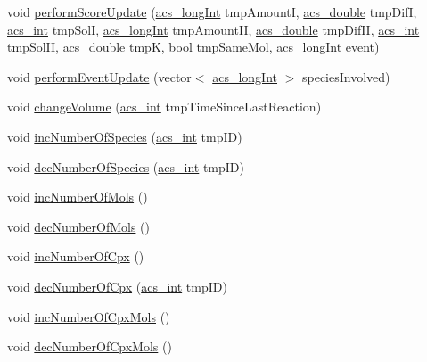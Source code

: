 \begin{DoxyCompactItemize}
\item 
void \hyperlink{a00014_ad25f6aa3ab2ac6097f57828bcf78e5c9}{perform\-Score\-Update} (\hyperlink{a00050_a19319d75f02db4308bc5c0026d98cd85}{acs\-\_\-long\-Int} tmp\-Amount\-I, \hyperlink{a00050_ab776853a005fcbf56af0424a2a4dd607}{acs\-\_\-double} tmp\-Dif\-I, \hyperlink{a00050_a8d277355641a098190360234e2ebde35}{acs\-\_\-int} tmp\-Sol\-I, \hyperlink{a00050_a19319d75f02db4308bc5c0026d98cd85}{acs\-\_\-long\-Int} tmp\-Amount\-I\-I, \hyperlink{a00050_ab776853a005fcbf56af0424a2a4dd607}{acs\-\_\-double} tmp\-Dif\-I\-I, \hyperlink{a00050_a8d277355641a098190360234e2ebde35}{acs\-\_\-int} tmp\-Sol\-I\-I, \hyperlink{a00050_ab776853a005fcbf56af0424a2a4dd607}{acs\-\_\-double} tmp\-K, bool tmp\-Same\-Mol, \hyperlink{a00050_a19319d75f02db4308bc5c0026d98cd85}{acs\-\_\-long\-Int} event)
\item 
void \hyperlink{a00014_ae7ef2ef3277e15e1644496e118ebb9bc}{perform\-Event\-Update} (vector$<$ \hyperlink{a00050_a19319d75f02db4308bc5c0026d98cd85}{acs\-\_\-long\-Int} $>$ species\-Involved)
\item 
void \hyperlink{a00014_a0156a2d7219396e58a930731966b0c66}{change\-Volume} (\hyperlink{a00050_a8d277355641a098190360234e2ebde35}{acs\-\_\-int} tmp\-Time\-Since\-Last\-Reaction)
\item 
void \hyperlink{a00014_a9fdf3a3b16809edd87c1b1963ef0a67f}{inc\-Number\-Of\-Species} (\hyperlink{a00050_a8d277355641a098190360234e2ebde35}{acs\-\_\-int} tmp\-I\-D)
\item 
void \hyperlink{a00014_a69a926e0b9bb4f4b29876d0e45b54d84}{dec\-Number\-Of\-Species} (\hyperlink{a00050_a8d277355641a098190360234e2ebde35}{acs\-\_\-int} tmp\-I\-D)
\item 
void \hyperlink{a00014_ae356db3b6ee374b998e9f041216b4b75}{inc\-Number\-Of\-Mols} ()
\item 
void \hyperlink{a00014_af042f7904c92fdd239995bebbab2cf60}{dec\-Number\-Of\-Mols} ()
\item 
void \hyperlink{a00014_a69ae530ef6f9298e3ab8304157709404}{inc\-Number\-Of\-Cpx} ()
\item 
void \hyperlink{a00014_aadd057e7038269e6fac314a12a3bf334}{dec\-Number\-Of\-Cpx} (\hyperlink{a00050_a8d277355641a098190360234e2ebde35}{acs\-\_\-int} tmp\-I\-D)
\item 
void \hyperlink{a00014_ab101d2158575829ddfe846087040f2fa}{inc\-Number\-Of\-Cpx\-Mols} ()
\item 
void \hyperlink{a00014_a756dc43b6b47498ba457613749324b15}{dec\-Number\-Of\-Cpx\-Mols} ()
\item 

\end{DoxyCompactItemize}
